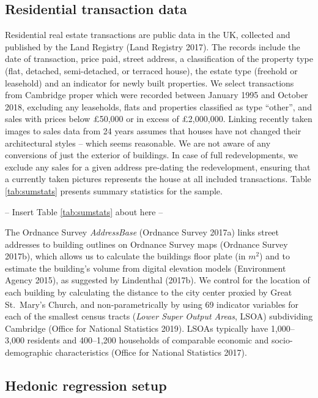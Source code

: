 \documentclass[]{article}
\begin{document}
\hypertarget{residential-transaction-data}{%
\subsection{Residential transaction
data}\label{residential-transaction-data}}

Residential real estate transactions are public data in the UK,
collected and published by the Land Registry (Land Registry 2017). The
records include the date of transaction, price paid, street address, a
classification of the property type (flat, detached, semi-detached, or
terraced house), the estate type (freehold or leasehold) and an
indicator for newly built properties. We select transactions from
Cambridge proper which were recorded between January 1995 and October
2018, excluding any leaseholds, flats and properties classified as type
``other'', and sales with prices below £50,000 or in excess of
£2,000,000. Linking recently taken images to sales data from 24 years
assumes that houses have not changed their architectural styles -- which
seems reasonable. We are not aware of any conversions of just the
exterior of buildings. In case of full redevelopments, we exclude any
sales for a given address pre-dating the redevelopment, ensuring that a
currently taken pictures represents the house at all included
transactions. Table \ref{tab:sumstats} presents summary statistics for
the sample.

\begin{center}
  -- Insert Table \ref{tab:sumstats} about here --
\end{center}

The Ordnance Survey \emph{AddressBase} (Ordnance Survey 2017a) links
street addresses to building outlines on Ordnance Survey maps (Ordnance
Survey 2017b), which allows us to calculate the buildings floor plate
(in \(m^2\)) and to estimate the building's volume from digital
elevation models (Environment Agency 2015), as suggested by Lindenthal
(2017b). We control for the location of each building by calculating the
distance to the city center proxied by Great St.~Mary's Church, and
non-parametrically by using 69 indicator variables for each of the
smallest census tracts (\emph{Lower Super Output Areas}, LSOA)
subdividing Cambridge (Office for National Statistics 2019). LSOAs
typically have 1,000--3,000 residents and 400--1,200 households of
comparable economic and socio-demographic characteristics (Office for
National Statistics 2017).

\hypertarget{hedonic-regression-setup}{%
\subsection{Hedonic regression setup}\label{hedonic-regression-setup}}
\end{document}
